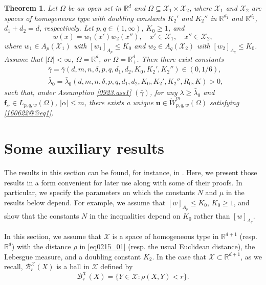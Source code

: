 \documentclass[reqno]{amsart}
\numberwithin{equation}{section}
\theoremstyle{plain}
\newtheorem{theorem}{Theorem}[section]
\theoremstyle{definition}
\theoremstyle{remark}
\begin{document}
\begin{theorem}		\label{160622@thm5}
Let $\Omega$ be an open set in ${\mathbb{R}}^d$  and $\Omega\subseteq {\mathcal{X}}_1\times {\mathcal{X}}_2$, where ${\mathcal{X}}_1$ and ${\mathcal{X}}_2$ are  spaces of homogeneous type with  doubling constants $K_2'$ and $K_2''$ in ${\mathbb{R}}^{d_1}$ and ${\mathbb{R}}^{d_2}$, $d_1+d_2=d$, respectively.
Let $p,q\in (1,\infty)$, $K_0\ge 1$, and 
$$
w(x)=w_1(x')w_2(x''), \quad x'\in {\mathcal{X}}_1, \quad x''\in {\mathcal{X}}_2,
$$
where $w_1\in A_p({\mathcal{X}}_1)$ with $[w_1]_{A_p}\le K_0$ and $w_2\in A_q({\mathcal{X}}_2)$ with $[w_2]_{A_q}\le K_0$.
Assume that $|\Omega|<\infty$, $\Omega={\mathbb{R}}^d$, or $\Omega={\mathbb{R}}^d_+$.
Then there exist constants 
\begin{align*}
&\bar{\gamma}=\bar{\gamma}(d,m,n,\delta,p,q,d_1,d_2,K_0, K_2', K_2'')\in (0,1/6),\\
&\bar{\lambda}_0=\bar{\lambda}_0(d,m,n,\delta,p,q,d_1,d_2,K_0,K_2'
,K_2'',R_0,K)>0,
\end{align*}
such that, under Assumption \ref{0923.ass1} $(\bar{\gamma})$, 
for any $\lambda\ge \bar{\lambda}_0$ and ${\boldsymbol{f}}_\alpha\in L_{p,q,w}(\Omega)$, $|\alpha|\le m$, there exists a unique
${\boldsymbol{u}}\in \mathring{W}^m_{p,q,w}(\Omega)$ satisfying \eqref{160622@@eq1}.
\end{theorem}

\section{Some auxiliary results}		

The results in this section can be found, for instance, in \cite{MR3243734, MR1232192}.
Here, we present those results in a form convenient for later use along with some of their proofs.
In particular, we specify the parameters on which the constants $N$ and $\mu$ in the results below depend.
For example, we assume that $[w]_{A_p} \le K_0$, $K_0 \ge 1$, and show that the constants $N$ in the inequalities depend on $K_0$ rather than $[w]_{A_q}$.

In this section, we assume that ${\mathcal{X}}$ is a space of homogeneous type in ${\mathbb{R}}^{d+1}$ (resp. ${\mathbb{R}}^d$) with the distance $\rho$ in \eqref{eq0215_01} (resp. the usual Euclidean distance), the Lebesgue measure, and a doubling constant $K_2$.
In the case that ${\mathcal{X}} \subset {\mathbb{R}}^{d+1}$, as we recall, ${\mathcal{B}}_r^{\mathcal{X}}(X)$ is a ball in ${\mathcal{X}}$ defined by 
$$
{\mathcal{B}}_r^{\mathcal{X}}(X)=\{Y\in {\mathcal{X}}:\rho(X,Y)<r\}.
$$
\end{document}
